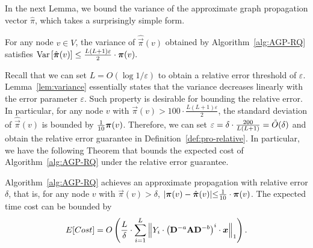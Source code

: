In the next Lemma, we bound the variance of the approximate graph propagation vector $\hat{\pi}$, which takes a surprisingly simple form. 
\vspace{-1mm}
\begin{lemma}
\vspace{-1mm}
	\label{lem:variance}
    For any node $v \in V$, the variance of $\hat{\vec{\pi}}(v)$ obtained by Algorithm~\ref{alg:AGP-RQ} satisfies 
    $	\Var \left[ \hat{\vec{\pi}}(v) \right]\le \frac{L(L+1)\varepsilon}{2} \cdot \vec{\pi}(v). $
\end{lemma}
\vspace{-1mm}
Recall that we can set $L=O(\log 1/\varepsilon)$ to obtain a relative error threshold of $\varepsilon$. Lemma~\ref{lem:variance} essentially states that the variance decreases linearly with the error parameter $\varepsilon$. Such property is desirable for bounding the relative error. In particular, for any node $v$ with $\vec{\pi}(v) > 100\cdot \frac{L(L+1)\varepsilon}{2}$, the standard deviation of $\hat{\vec{\pi}}(v)$ is bounded by ${1\over 10}\vec{\pi}(v)$. Therefore, we can set $\varepsilon = \delta \cdot \frac{200}{L(L+1)} = \Tilde{O}(\delta)$ and obtain the relative error guarantee in Definition~\ref{def:pro-relative}.
In particular, we have the following Theorem that bounds the expected cost of Algorithm~\ref{alg:AGP-RQ} under the relative error guarantee.

\vspace{-1mm}
\begin{theorem}\label{thm:RP-error}
Algorithm~\ref{alg:AGP-RQ} achieves an approximate propagation with relative error $\delta$, that is, for any node $v$ with $\vec{\pi}(v)>\delta$, $\left|\vec{\pi}(v)-\hat{\vec{\pi}}(v)\right|\hspace{-1mm} \leq \hspace{-1mm}\frac{1}{10} \cdot \vec{\pi}(v)$. The expected time cost can be bounded by
\vspace{-2mm}
\begin{equation*}
\vspace{-1mm}
E[Cost] =	O\left(\frac{L}{\delta}\cdot \sum_{i=1}^{L} \left\| Y_i \cdot \left(\mathbf{D}^{-a}\mathbf{A}\mathbf{D}^{-b} \right)^i \cdot \vec{x} \right\|_1\right).
\end{equation*}
\end{theorem}

